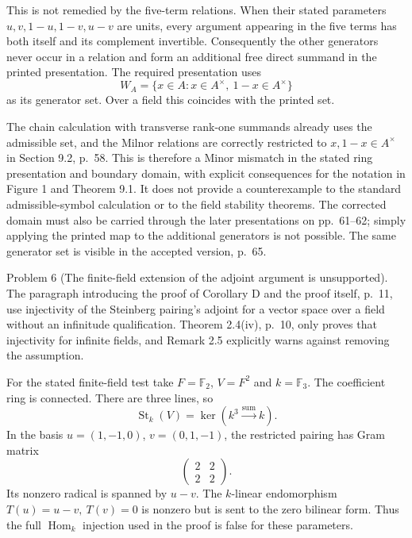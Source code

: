 \documentclass[10pt]{article}
\begin{document}
This is not remedied by the five-term relations. When their stated parameters \(u,v,1-u,1-v,u-v\) are units, every argument appearing in the five terms has both itself and its complement invertible. Consequently the other generators never occur in a relation and form an additional free direct summand in the printed presentation. The required presentation uses \[W_A=\{x\in A: x\in A^\times,\ 1-x\in A^\times\}\] as its generator set. Over a field this coincides with the printed set.\par
The chain calculation with transverse rank-one summands already uses the admissible set, and the Milnor relations are correctly restricted to \(x,1-x\in A^\times\) in Section 9.2, p. 58. This is therefore a Minor mismatch in the stated ring presentation and boundary domain, with explicit consequences for the notation in Figure 1 and Theorem 9.1. It does not provide a counterexample to the standard admissible-symbol calculation or to the field stability theorems. The corrected domain must also be carried through the later presentations on pp. 61–62; simply applying the printed map to the additional generators is not possible. The same generator set is visible in the accepted version, p. 65.\par
Problem 6 (The finite-field extension of the adjoint argument is unsupported).  The paragraph introducing the proof of Corollary D and the proof itself, p. 11, use injectivity of the Steinberg pairing’s adjoint for a vector space over a field without an infinitude qualification. Theorem 2.4(iv), p. 10, only proves that injectivity for infinite fields, and Remark 2.5 explicitly warns against removing the assumption.\par
For the stated finite-field test take \(F=\mathbb F_2\), \(V=F^2\) and \(k=\mathbb F_3\). The coefficient ring is connected. There are three lines, so \[\operatorname{St}_k(V)=\ker(k^3\xrightarrow{\text{sum}}k).\] In the basis \(u=(1,-1,0)\), \(v=(0,1,-1)\), the restricted pairing has Gram matrix \[\begin{pmatrix}2&2\\2&2\end{pmatrix}.\] Its nonzero radical is spanned by \(u-v\). The \(k\)-linear endomorphism \(T(u)=u-v,\ T(v)=0\) is nonzero but is sent to the zero bilinear form. Thus the full \(\operatorname{Hom}_k\) injection used in the proof is false for these parameters.\par
\end{document}
